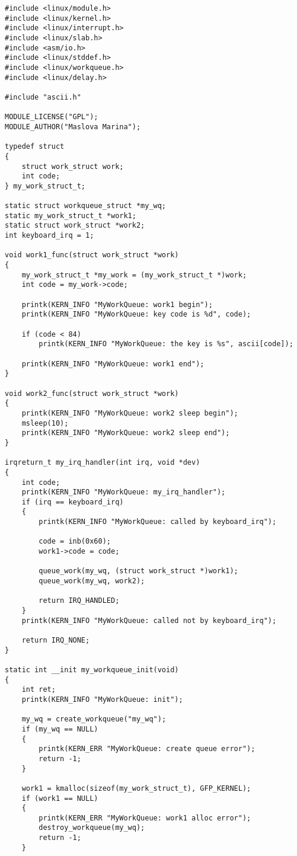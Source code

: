 \documentclass{bmstu}
\begin{document}
\noindent
\begin{lstlisting}
#include <linux/module.h>
#include <linux/kernel.h>
#include <linux/interrupt.h>
#include <linux/slab.h>
#include <asm/io.h>
#include <linux/stddef.h>
#include <linux/workqueue.h>
#include <linux/delay.h>

#include "ascii.h"

MODULE_LICENSE("GPL");
MODULE_AUTHOR("Maslova Marina");

typedef struct
{
    struct work_struct work;
    int code;
} my_work_struct_t;

static struct workqueue_struct *my_wq;
static my_work_struct_t *work1;
static struct work_struct *work2;
int keyboard_irq = 1;

void work1_func(struct work_struct *work)
{
    my_work_struct_t *my_work = (my_work_struct_t *)work;
    int code = my_work->code;

    printk(KERN_INFO "MyWorkQueue: work1 begin");
    printk(KERN_INFO "MyWorkQueue: key code is %d", code);

    if (code < 84)
        printk(KERN_INFO "MyWorkQueue: the key is %s", ascii[code]);

    printk(KERN_INFO "MyWorkQueue: work1 end");
}

void work2_func(struct work_struct *work)
{
    printk(KERN_INFO "MyWorkQueue: work2 sleep begin");
    msleep(10);
    printk(KERN_INFO "MyWorkQueue: work2 sleep end");
}

irqreturn_t my_irq_handler(int irq, void *dev)
{
    int code;
    printk(KERN_INFO "MyWorkQueue: my_irq_handler");
    if (irq == keyboard_irq)
    {
        printk(KERN_INFO "MyWorkQueue: called by keyboard_irq");

        code = inb(0x60);
        work1->code = code;

        queue_work(my_wq, (struct work_struct *)work1);
        queue_work(my_wq, work2);

        return IRQ_HANDLED;
    }
    printk(KERN_INFO "MyWorkQueue: called not by keyboard_irq");

    return IRQ_NONE;
}

static int __init my_workqueue_init(void)
{
    int ret;
    printk(KERN_INFO "MyWorkQueue: init");

    my_wq = create_workqueue("my_wq");
    if (my_wq == NULL)
    {
        printk(KERN_ERR "MyWorkQueue: create queue error");
        return -1;
    }

    work1 = kmalloc(sizeof(my_work_struct_t), GFP_KERNEL);
    if (work1 == NULL)
    {
        printk(KERN_ERR "MyWorkQueue: work1 alloc error");
        destroy_workqueue(my_wq);
        return -1;
    }


\end{lstlisting}
\end{document}
